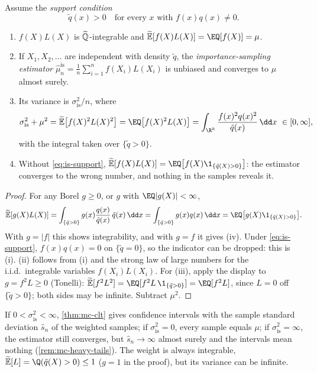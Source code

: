 \begin{proposition}\label{prop:is-likelihood-ratio}
Assume the \emph{support condition}
\begin{equation}\label{eq:is-support}
  \tilde q(x)>0\quad\text{for every }x\text{ with }f(x)q(x)\neq0 .
\end{equation}
\begin{enumerate}[label=(\roman*)]
  \item $f(X)L(X)$ is $\widetilde{\mathbb Q}$-integrable and $\Et[f(X)L(X)]=\EQ[f(X)]=\mu$.
  \item If $X_1,X_2,\dots$ are independent with density $\tilde q$, the
    \emph{importance-sampling estimator}
    $\hat\mu^{\mathrm{is}}_n=\frac1n\sum_{i=1}^nf(X_i)L(X_i)$ is unbiased and converges to
    $\mu$ almost surely.
  \item Its variance is $\sigma_{\mathrm{is}}^2/n$, where
    \begin{equation}\label{eq:is-variance}
      \sigma_{\mathrm{is}}^2+\mu^2=\Et\big[f(X)^2L(X)^2\big]=\EQ\big[f(X)^2L(X)\big]
      =\int_{\R^k}\frac{f(x)^2q(x)^2}{\tilde q(x)}\,\dd x\ \in[0,\infty],
    \end{equation}
    with the integral taken over $\{\tilde q>0\}$.
  \item Without \eqref{eq:is-support}, $\Et[f(X)L(X)]=\EQ\big[f(X)\1_{\{\tilde q(X)>0\}}\big]$:
    the estimator converges to the wrong number, and nothing in the samples reveals it.
\end{enumerate}
\end{proposition}

\begin{proof}
For any Borel $g\ge0$, or $g$ with $\EQ|g(X)|<\infty$,
\[
  \Et[g(X)L(X)]=\int_{\{\tilde q>0\}}g(x)\frac{q(x)}{\tilde q(x)}\,\tilde q(x)\,\dd x
  =\int_{\{\tilde q>0\}}g(x)q(x)\,\dd x=\EQ\big[g(X)\1_{\{\tilde q(X)>0\}}\big].
\]
With $g=|f|$ this shows integrability, and with $g=f$ it gives (iv). Under
\eqref{eq:is-support}, $f(x)q(x)=0$ on $\{\tilde q=0\}$, so the indicator can be dropped:
this is (i). (ii) follows from (i) and the strong law of large numbers for the i.i.d.\
integrable variables $f(X_i)L(X_i)$. For (iii), apply the display to $g=f^2L\ge0$ (Tonelli):
$\Et[f^2L^2]=\EQ[f^2L\,\1_{\{\tilde q>0\}}]=\EQ[f^2L]$, since $L=0$ off $\{\tilde q>0\}$;
both sides may be infinite. Subtract $\mu^2$.
\end{proof}

If $0<\sigma^2_{\mathrm{is}}<\infty$, \cref{thm:mc-clt} gives confidence intervals with the
sample standard deviation $\hat s_n$ of the weighted samples; if $\sigma^2_{\mathrm{is}}=0$,
every sample equals $\mu$; if $\sigma^2_{\mathrm{is}}=\infty$, the estimator still converges,
but $\hat s_n\to\infty$ almost surely and the intervals mean nothing
(\cref{rem:mc-heavy-tails}). The weight is always integrable, $\Et[L]=\Q(\tilde q(X)>0)\le1$
($g=1$ in the proof), but its variance can be infinite.

